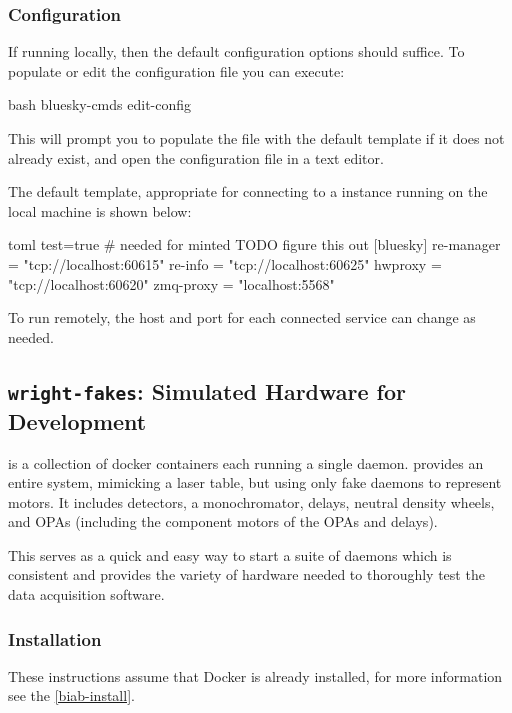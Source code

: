\subsubsection{Configuration}

If running locally, then the default configuration options should suffice.
To populate or edit the configuration file you can execute:

\begin{codefragment}{bash}
bluesky-cmds edit-config
\end{codefragment}

This will prompt you to populate the file with the default template if it does not already exist, and open the configuration file in a text editor.

The default template, appropriate for connecting to a \biab instance running on the local machine is shown below:

\begin{codefragment}{toml}
test=true # needed for minted TODO figure this out
[bluesky]
re-manager = "tcp://localhost:60615"
re-info = "tcp://localhost:60625"
hwproxy = "tcp://localhost:60620"
zmq-proxy = "localhost:5568"
\end{codefragment}

To run remotely, the host and port for each connected service can change as needed.

\subsection{\texttt{wright-fakes}: Simulated Hardware for Development}
\label{wright-fakes}

\wrightfakes is a collection of docker containers each running a single \yaq daemon.
\wrightfakes provides an entire system, mimicking a laser table, but using only fake daemons to represent motors.
It includes detectors, a monochromator, delays, neutral density wheels, and OPAs (including the component motors of the OPAs and delays).

This serves as a quick and easy way to start a suite of \yaq daemons which is consistent and provides the variety of hardware needed to thoroughly test the data acquisition software.

\subsubsection{Installation}
These instructions assume that Docker is already installed, for more information see the \ref{biab-install}.


